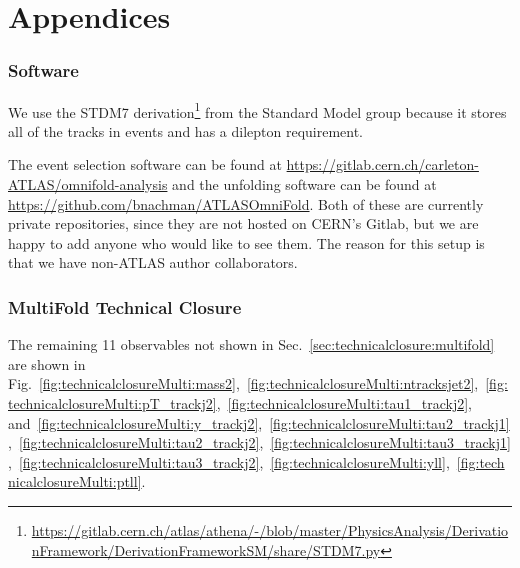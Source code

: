 \documentclass[NOTE, atlasdraft=true, texlive=2016, UKenglish]{\ATLASLATEXPATH atlasdoc}
\begin{document}
\clearpage
\appendix
\part*{Appendices}

\section{Software}

We use the STDM7 derivation\footnote{\url{https://gitlab.cern.ch/atlas/athena/-/blob/master/PhysicsAnalysis/DerivationFramework/DerivationFrameworkSM/share/STDM7.py}} from the Standard Model group because it stores all of the tracks in events and has a dilepton requirement. 

The event selection software can be found at \url{https://gitlab.cern.ch/carleton-ATLAS/omnifold-analysis} and the unfolding software can be found at \url{https://github.com/bnachman/ATLASOmniFold}.  Both of these are currently private repositories, since they are not hosted on CERN's Gitlab, but we are happy to add anyone who would like to see them.  The reason for this setup is that we have non-ATLAS author collaborators.  





\section{MultiFold Technical Closure}
\label{sec:multifoldtechnicalclosure}

The remaining 11 observables not shown in Sec.~\ref{sec:technicalclosure:multifold} are shown in Fig.~\ref{fig:technicalclosureMulti:mass2},~\ref{fig:technicalclosureMulti:ntracksjet2},~\ref{fig:technicalclosureMulti:pT_trackj2},~\ref{fig:technicalclosureMulti:tau1_trackj2}, and~\ref{fig:technicalclosureMulti:y_trackj2},~\ref{fig:technicalclosureMulti:tau2_trackj1},~\ref{fig:technicalclosureMulti:tau2_trackj2},~\ref{fig:technicalclosureMulti:tau3_trackj1},~\ref{fig:technicalclosureMulti:tau3_trackj2},~\ref{fig:technicalclosureMulti:yll},~\ref{fig:technicalclosureMulti:ptll}.
\end{document}
